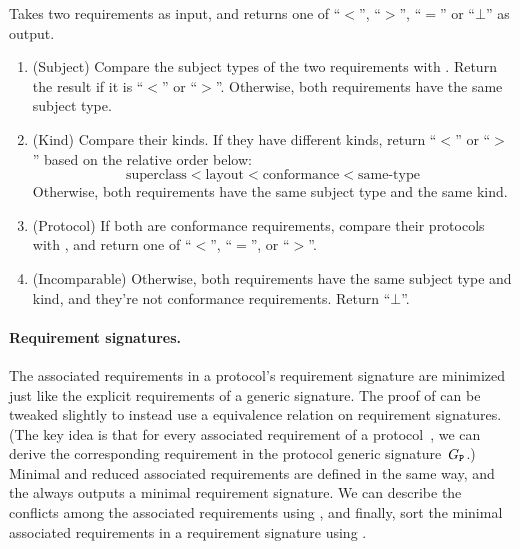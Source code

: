 \documentclass[../generics]{subfiles}
\begin{document}
\begin{algorithm}\label{requirement order}
 Takes two requirements as input, and returns one of ``$<$'', ``$>$'', ``$=$'' or \index{$\bot$}``$\bot$'' as output.
\begin{enumerate}
\item (Subject) Compare the subject types of the two requirements with . Return the result if it is ``$<$'' or ``$>$''. Otherwise, both requirements have the same subject type.
\item (Kind)  Compare their kinds. If they have different kinds, return ``$<$'' or ``$>$'' based on the relative order below:
\[\text{superclass} < \text{layout} < \text{conformance} < \text{same-type}\]
Otherwise, both requirements have the same subject type and the same kind.
\item (Protocol) If both are conformance requirements, compare their protocols with , and return one of ``$<$'', ``$=$'', or ``$>$''.
\item (Incomparable) Otherwise, both requirements have the same subject type and kind, and they're not conformance requirements. Return ``$\bot$''.
\end{enumerate}
\end{algorithm}

\paragraph{Requirement signatures.} The associated requirements in a protocol's requirement signature are minimized just like the explicit requirements of a generic signature. The proof of  can be tweaked slightly to instead use a equivalence relation on requirement signatures. (The key idea is that for every associated requirement of a protocol~\tP, we can derive the corresponding requirement in the protocol generic signature~$G_{\texttt{P}}$.) Minimal and reduced associated requirements are defined in the same way, and the  always outputs a minimal requirement signature. We can describe the conflicts among the associated requirements using , and finally, sort the minimal associated requirements in a requirement signature using .
\end{document}
